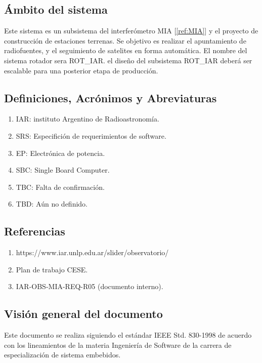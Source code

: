 \documentclass[12pt,a4paper, twosite]{article}
\begin{document}
	\subsection{Ámbito del sistema}
	\label{sec:org12e44a1}
	Este sistema es un subsistema del interferómetro MIA [\ref{ref:MIA}] y el proyecto de construcción de estaciones terrenas. Se objetivo es realizar el apuntamiento de radiofuentes, y el seguimiento de satelites en forma automática.  El nombre del sistema rotador sera ROT\_IAR. el diseño del subsistema ROT\_IAR deberá ser escalable para una posterior etapa de producción.
	
	
	\subsection{Definiciones, Acrónimos y Abreviaturas}
	\label{sec:orgb158e36}
	\begin{enumerate}
		\item IAR: instituto Argentino de Radioastronomía.  
		\item SRS: Especifición de requerimientos de software.  
		\item EP: Electrónica de potencia.
		\item SBC: Single Board Computer.
		\item TBC: Falta de confirmación.
		\item TBD: Aún no definido.
		  
		
	\end{enumerate}
	
	
	
	\subsection{Referencias}
	\label{sec:org62711e0}
	\begin{enumerate}
		\item \label{ref:MIA}https://www.iar.unlp.edu.ar/slider/observatorio/
		\item \label{ref:ptr} Plan de trabajo CESE.
		\item \label{ref:ptr} IAR-OBS-MIA-REQ-R05 (documento interno).
\end{enumerate}
	
	\subsection{Visión general del documento}
	\label{sec:orgdaca22c}
	
	Este documento se realiza siguiendo el estándar IEEE Std. 830-1998 de acuerdo con los lineamientos de la 
	materia Ingeniería de Software de la carrera de especialización de sistema embebidos.
	
\end{document}
